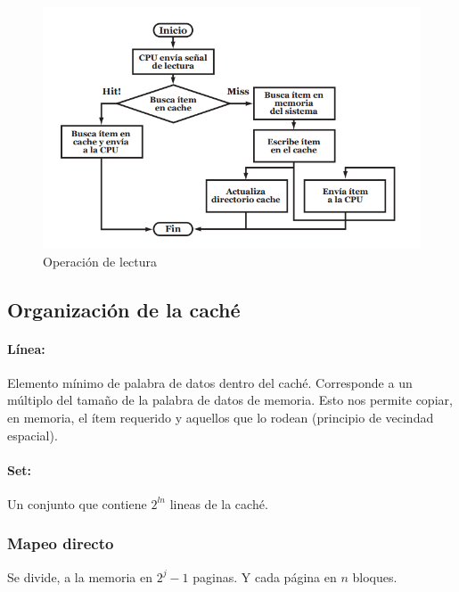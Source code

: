 \begin{figure}[ht]
	\centering
	\includegraphics[width=1\textwidth]{imagenes/cache}
	\caption{Operación de lectura}
	\label{fig:reading-operation}
\end{figure}

\subsection{Organización de la caché}

\paragraph{Línea:} Elemento mínimo de palabra de datos dentro del caché. Corresponde a un múltiplo del tamaño de la palabra de datos de memoria. Esto nos permite copiar, en memoria, el ítem requerido y aquellos que lo rodean (principio de vecindad espacial).

\paragraph{Set:} Un conjunto que contiene $2^{ln}$ lineas de la caché.

\subsubsection{Mapeo directo}
Se divide, a la memoria en $2^j - 1$ paginas. Y cada página en $n$ bloques.

